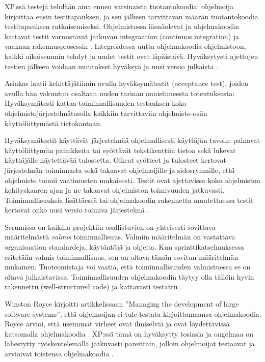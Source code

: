 \documentclass[finnish]{tktltiki2}
\theoremstyle{definition}
\theoremstyle{remark}
\begin{document}
{XP.ssä testejä tehdään aina ennen varsinaista tuotantokoodia: ohjelmoija kirjoittaa ensin testitapauksen, ja sen jälkeen tarvittavan määrän tuotantokoodia testitapauksen ratkaisemiseksi. Ohjelmistossa läsnäolevat ja ohjelmakoodin kattavat testit varmistavat jatkuvan integraation (continuos integration) ja vaakaan rakennusprosessin \cite{FOW01a}. Integroidessa uutta ohjelmakoodia ohjelmistoon, kaikki aikaisemmin tehdyt ja uudet testit ovat läpäistävä. Hyväksytysti ajettujen testien jälkeen voidaan muutokset hyväksyä ja uusi versio julkaista \cite{BEC99}.

Asiakas laatii kehittäjätiimin avulla hyväksymätestit (acceptance test), joiden avulla hän vakuutuu osaltaan uuden tarinan onnistuneesta toteutuksesta: Hyväksymätesti kattaa toiminnallisuuden testauksen koko ohjelmistojärjestelmätasolla kaikkiin tarvittaviin ohjelmisto-osiin käyttöliittymästä tietokantaan.

Hyväksymätestit käyttävät järjestelmää ohjelmallisesti käyttäjän tavoin: painavat käyttöliittymän painikkeita tai syöttävät tekstikenttiin tietoa sekä lukevat käyttäjälle näytettävää tulostetta. Oikeat syötteet ja tulosteet kertovat järjestelmän toiminnasta sekä takaavat ohjelmoijille ja sidosryhmille, että ohjelmisto toimii vaatimusten mukaisesti. Testit ovat ajettavissa koko ohjelmiston kehityskaaren ajan ja ne takaavat ohjelmiston toimivuuden jatkuvasti. Toiminnallisuuksia lisättäessä tai ohjelmakoodin rakennetta muutettaessa testit kertovat onko uusi versio toimiva järjestelmä \cite{BEC99}.

Scrumissa on kaikilla projektiin osallistuvien on yhteisesti sovittava määritel\-mästä \textit{valmis} toiminnallisuus. Valmiin määritelmän on vastattava organisaation standardeja, käytäntöjä ja ohjeita. Kun sprinttikatselmuksessa esitetään valmis toiminnallisuus, sen on oltava tämän sovitun määritelmän mukainen. Tuoteomistaja voi vaatia, että toiminnallisuuden valmistuessa se on oltava julkaistavissa. Toiminnallisuuden ohjelmakoodin täytyy olla tällöin hyvin rakennettu (well-structured code) ja kattavasti testattu \cite{SCH09}.

Winston Royce kirjoitti artikkelissaan ''Managing the development of large software systems'', että ohjelmoijan ei tule testata kirjoittamaansa ohjelmakoodia. Royce arvioi, että useimmat virheet ovat ilmiselviä ja ovat löydettävissä katsomalla ohjelmakoodia \cite{ROY70}. XP:ssä tämä on hyväksytty tosiasia ja ongelmaa on lähestytty työskentelemällä jatkuvasti pareittain, jolloin ohjelmoijat testaavat ja arvioivat toistensa ohjelmakoodia \cite{BEC99}.


}
\end{document}
